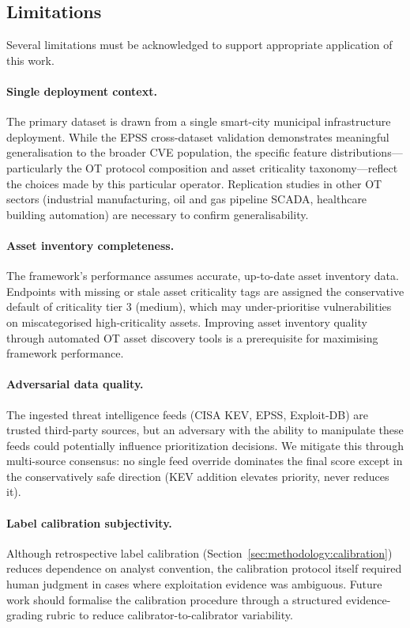 \documentclass[review,12pt]{elsarticle}
\begin{document}
\subsection{Limitations}

Several limitations must be acknowledged to support appropriate application of this work.

\paragraph{Single deployment context.} The primary dataset is drawn from a single smart-city municipal infrastructure deployment. While the EPSS cross-dataset validation demonstrates meaningful generalisation to the broader CVE population, the specific feature distributions---particularly the OT protocol composition and asset criticality taxonomy---reflect the choices made by this particular operator. Replication studies in other OT sectors (industrial manufacturing, oil and gas pipeline SCADA, healthcare building automation) are necessary to confirm generalisability.

\paragraph{Asset inventory completeness.} The framework's performance assumes accurate, up-to-date asset inventory data. Endpoints with missing or stale asset criticality tags are assigned the conservative default of criticality tier 3 (medium), which may under-prioritise vulnerabilities on miscategorised high-criticality assets. Improving asset inventory quality through automated OT asset discovery tools is a prerequisite for maximising framework performance.

\paragraph{Adversarial data quality.} The ingested threat intelligence feeds (CISA KEV, EPSS, Exploit-DB) are trusted third-party sources, but an adversary with the ability to manipulate these feeds could potentially influence prioritization decisions. We mitigate this through multi-source consensus: no single feed override dominates the final score except in the conservatively safe direction (KEV addition elevates priority, never reduces it).

\paragraph{Label calibration subjectivity.} Although retrospective label calibration (Section~\ref{sec:methodology:calibration}) reduces dependence on analyst convention, the calibration protocol itself required human judgment in cases where exploitation evidence was ambiguous. Future work should formalise the calibration procedure through a structured evidence-grading rubric to reduce calibrator-to-calibrator variability.
\end{document}
